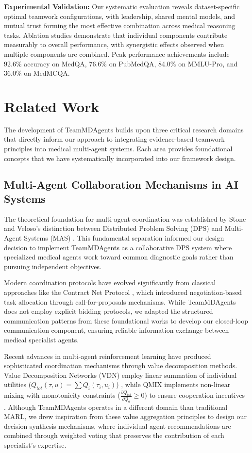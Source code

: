 \documentclass[letterpaper]{article} %
\begin{document}
\textbf{Experimental Validation:} Our systematic evaluation reveals dataset-specific optimal teamwork configurations, with leadership, shared mental models, and mutual trust forming the most effective combination across medical reasoning tasks. Ablation studies demonstrate that individual components contribute measurably to overall performance, with synergistic effects observed when multiple components are combined. Peak performance achievements include 92.6\% accuracy on MedQA, 76.6\% on PubMedQA, 84.0\% on MMLU-Pro, and 36.0\% on MedMCQA.\\

\section{Related Work}

The development of TeamMDAgents builds upon three critical research domains that directly inform our approach to integrating evidence-based teamwork principles into medical multi-agent systems. Each area provides foundational concepts that we have systematically incorporated into our framework design.

\subsection{Multi-Agent Collaboration Mechanisms in AI Systems}

The theoretical foundation for multi-agent coordination was established by Stone and Veloso's distinction between Distributed Problem Solving (DPS) and Multi-Agent Systems (MAS) \cite{stone1997distributed}. This fundamental separation informed our design decision to implement TeamMDAgents as a collaborative DPS system where specialized medical agents work toward common diagnostic goals rather than pursuing independent objectives.

Modern coordination protocols have evolved significantly from classical approaches like the Contract Net Protocol \cite{smith1980contract}, which introduced negotiation-based task allocation through call-for-proposals mechanisms. While TeamMDAgents does not employ explicit bidding protocols, we adapted the structured communication patterns from these foundational works to develop our closed-loop communication component, ensuring reliable information exchange between medical specialist agents.

Recent advances in multi-agent reinforcement learning have produced sophisticated coordination mechanisms through value decomposition methods. Value Decomposition Networks (VDN) employ linear summation of individual utilities ($Q_{tot}(\tau, u) = \sum Q_i(\tau_i, u_i)$) \cite{sunehag2018value}, while QMIX implements non-linear mixing with monotonicity constraints ($\frac{\partial Q_{tot}}{\partial Q_a} \geq 0$) to ensure cooperation incentives \cite{rashid2018qmix}. Although TeamMDAgents operates in a different domain than traditional MARL, we drew inspiration from these value aggregation principles to design our decision synthesis mechanisms, where individual agent recommendations are combined through weighted voting that preserves the contribution of each specialist's expertise.
\end{document}

